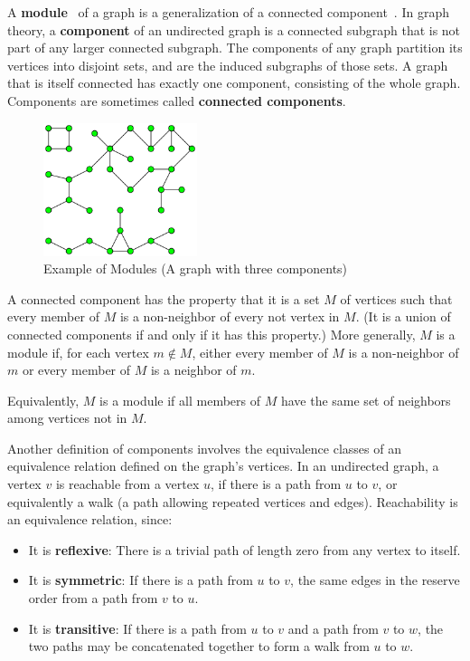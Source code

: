 A \textbf{module}~\cite{mdwikipedia} of a graph is a generalization of a connected component~\cite{componentwikipedia}.
In graph theory, a \textbf{component} of an undirected graph is a connected subgraph that is not part of any larger connected subgraph.
The components of any graph partition its vertices into disjoint sets, and are the induced subgraphs of those sets.
A graph that is itself connected has exactly one component, consisting of the whole graph.
Components are sometimes called \textbf{connected components}.

\begin{figure}[!h]
    \centering
    \includegraphics[width=0.40\textwidth]{images/graphs/Pseudoforest}
    \caption{Example of Modules (A graph with three components) \cite{componentwikipedia}}
    \label{fig:example-modules}
\end{figure}

A connected component has the property that it is a set $M$ of vertices such that every member of $M$ is a non-neighbor of every not vertex in $M$.
(It is a union of connected components if and only if it has this property.)
More generally, $M$ is a module if, for each vertex $m \notin M$, either every member of $M$ is a non-neighbor of $m$ or every member of $M$ is a neighbor of $m$.

Equivalently, $M$ is a module if all members of $M$ have the same set of neighbors among vertices not in $M$.

Another definition of components involves the equivalence classes of an equivalence relation defined on the graph's vertices.
In an undirected graph, a vertex $v$ is reachable from a vertex $u$, if there is a path from $u$ to $v$, or equivalently a walk (a path allowing repeated vertices and edges).
Reachability is an equivalence relation, since:
\begin{itemize}
    \item It is \textbf{reflexive}: There is a trivial path of length zero from any vertex to itself.
    \item It is \textbf{symmetric}: If there is a path from $u$ to $v$, the same edges in the reserve order from a path from $v$ to $u$.
    \item It is \textbf{transitive}: If there is a path from $u$ to $v$ and a path from $v$ to $w$, the two paths may be concatenated together to form a walk from $u$ to $w$.
\end{itemize}

